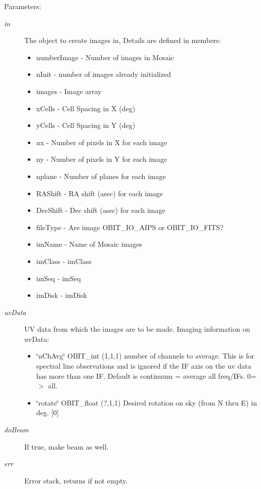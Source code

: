 \begin{Desc}
\item[Parameters:]
\begin{description}
\item[{\em in}]The object to create images in, Details are defined in members: \begin{itemize}
\item number\-Image - Number of images in Mosaic \item n\-Init - number of images already initialized \item images - Image array \item x\-Cells - Cell Spacing in X (deg) \item y\-Cells - Cell Spacing in Y (deg) \item nx - Number of pixels in X for each image \item ny - Number of pixels in Y for each image \item nplane - Number of planes for each image \item RAShift - RA shift (asec) for each image \item Dec\-Shift - Dec shift (asec) for each image \item file\-Type - Are image OBIT\_\-IO\_\-AIPS or OBIT\_\-IO\_\-FITS? \item im\-Name - Name of Mosaic images \item im\-Class - im\-Class \item im\-Seq - im\-Seq \item im\-Disk - im\-Disk \end{itemize}
\item[{\em uv\-Data}]UV data from which the images are to be made. Imaging information on uv\-Data: \begin{itemize}
\item \char`\"{}n\-Ch\-Avg\char`\"{} OBIT\_\-int (1,1,1) number of channels to average. This is for spectral line observations and is ignored if the IF axis on the uv data has more than one IF. Default is continuum = average all freq/IFs. 0=$>$ all. \item \char`\"{}rotate\char`\"{} OBIT\_\-float (?,1,1) Desired rotation on sky (from N thru E) in deg. [0] \end{itemize}
\item[{\em do\-Beam}]If true, make beam as well. \item[{\em err}]Error stack, returns if not empty. \end{description}
\end{Desc}
